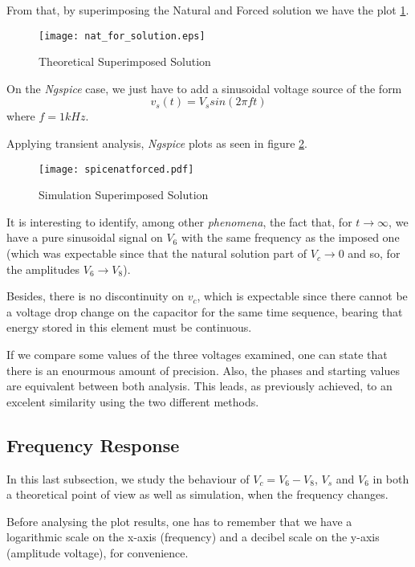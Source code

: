 From that, by superimposing the Natural and Forced solution we have the plot \ref{fig:sub1}.

\begin{figure}[h]
    \centering
  \texttt{[image: nat\_for\_solution.eps]}
  \caption{Theoretical Superimposed Solution}
  \label{fig:sub1}
\end{figure}


On the \textit{Ngspice} case, we just have to add a sinusoidal voltage source of the form 
\begin{equation} \nonumber
 v_s(t)=V_s sin (2\pi f t)   
\end{equation}
 where $f=1 kHz$.
 
Applying transient analysis, \textit{Ngspice} plots as seen in figure \ref{fig:sub2}.
 
\begin{figure}[h]
    \centering
  \texttt{[image: spicenatforced.pdf]}
  \caption{Simulation Superimposed Solution}
  \label{fig:sub2}
\end{figure}

\clearpage

It is interesting to identify, among other \textit{phenomena}, the fact that, for $t\to\infty$, we have a pure sinusoidal signal on $V_6$ with the same frequency as the imposed one (which was expectable since that the natural solution part of $V_c\to0$ and so, for the amplitudes $V_6 \to V_8$).

Besides, there is no discontinuity on $v_c$, which is expectable since there cannot be a voltage drop change on the capacitor for the same time sequence, bearing that energy stored in this element must be continuous.

If we compare some values of the three voltages examined, one can state that there is an enourmous amount of precision. Also, the phases and starting values are equivalent between both analysis. This leads, as previously achieved, to an excelent similarity using the two different methods.

\subsection{Frequency Response}
\label{subsec:frequency_response}

In this last subsection, we study the behaviour of $V_c=V_6-V_8$, $V_s$ and $V_6$ in both a theoretical point of view as well as simulation, when the frequency changes. 

Before analysing the plot results, one has to remember that we have a logarithmic scale on the x-axis (frequency) and a decibel scale on the y-axis (amplitude voltage), for convenience.

